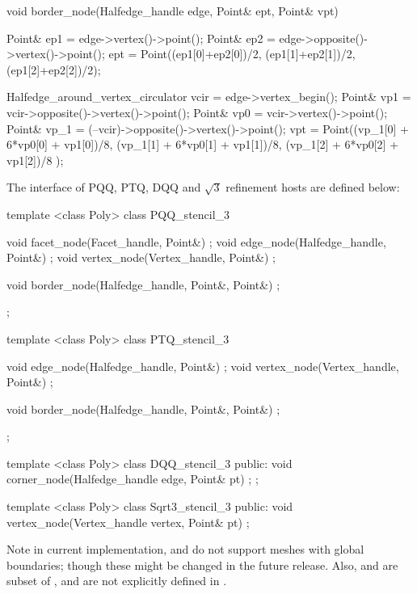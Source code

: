 

\begin{ccExampleCode}
  void border_node(Halfedge_handle edge, Point& ept, Point& vpt) {
    Point& ep1 = edge->vertex()->point();
    Point& ep2 = edge->opposite()->vertex()->point();
    ept = Point((ep1[0]+ep2[0])/2, (ep1[1]+ep2[1])/2, (ep1[2]+ep2[2])/2);

    Halfedge_around_vertex_circulator vcir = edge->vertex_begin();
    Point& vp1  = vcir->opposite()->vertex()->point();
    Point& vp0  = vcir->vertex()->point();
    Point& vp_1 = (--vcir)->opposite()->vertex()->point();
    vpt = Point((vp_1[0] + 6*vp0[0] + vp1[0])/8,
                (vp_1[1] + 6*vp0[1] + vp1[1])/8,
                (vp_1[2] + 6*vp0[2] + vp1[2])/8 );
  }
\end{ccExampleCode}


The interface of PQQ, PTQ, DQQ and $\sqrt{3}$ refinement hosts are 
defined below:


\begin{ccExampleCode}
template <class Poly>
class PQQ_stencil_3 {
  void facet_node(Facet_handle, Point&) {};
  void edge_node(Halfedge_handle, Point&) {};
  void vertex_node(Vertex_handle, Point&) {};

  void border_node(Halfedge_handle, Point&, Point&) {};
};

template <class Poly>
class PTQ_stencil_3 {
  void edge_node(Halfedge_handle, Point&) {};
  void vertex_node(Vertex_handle, Point&) {};

  void border_node(Halfedge_handle, Point&, Point&) {};
};

template <class Poly>
class DQQ_stencil_3 {
public:
  void corner_node(Halfedge_handle edge, Point& pt) {};
};

template <class Poly>
class Sqrt3_stencil_3 {
public:
  void vertex_node(Vertex_handle vertex, Point& pt) {}
};
\end{ccExampleCode}

Note in current implementation,  and 
 do not support
meshes with global boundaries; though these might be changed
in the future release. Also,  and
 are subset of , and are not
explicitly defined in .

